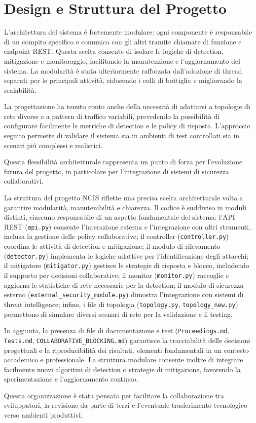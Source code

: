 \section{Design e Struttura del Progetto}
L'architettura del sistema è fortemente modulare: ogni componente è responsabile di un compito specifico e comunica con gli altri tramite chiamate di funzione e endpoint REST. Questa scelta consente di isolare le logiche di detection, mitigazione e monitoraggio, facilitando la manutenzione e l'aggiornamento del sistema. La modularità è stata ulteriormente rafforzata dall'adozione di thread separati per le principali attività, riducendo i colli di bottiglia e migliorando la scalabilità.\par
La progettazione ha tenuto conto anche della necessità di adattarsi a topologie di rete diverse e a pattern di traffico variabili, prevedendo la possibilità di configurare facilmente le metriche di detection e le policy di risposta. L'approccio seguito permette di validare il sistema sia in ambienti di test controllati sia in scenari più complessi e realistici.\par
Questa flessibilità architetturale rappresenta un punto di forza per l'evoluzione futura del progetto, in particolare per l'integrazione di sistemi di sicurezza collaborativi.

La struttura del progetto NCIS riflette una precisa scelta architetturale volta a garantire modularità, manutenibilità e chiarezza. Il codice è suddiviso in moduli distinti, ciascuno responsabile di un aspetto fondamentale del sistema: l'API REST (\texttt{api.py}) consente l'interazione esterna e l'integrazione con altri strumenti, inclusa la gestione delle policy collaborative; il controller (\texttt{controller.py}) coordina le attività di detection e mitigazione; il modulo di rilevamento (\texttt{detector.py}) implementa le logiche adattive per l'identificazione degli attacchi; il mitigatore (\texttt{mitigator.py}) gestisce le strategie di risposta e blocco, includendo il supporto per decisioni collaborative; il monitor (\texttt{monitor.py}) raccoglie e aggiorna le statistiche di rete necessarie per la detection; il modulo di sicurezza esterno (\texttt{external\_security\_module.py}) dimostra l'integrazione con sistemi di threat intelligence; infine, i file di topologia (\texttt{topology.py}, \texttt{topology\_new.py}) permettono di simulare diversi scenari di rete per la validazione e il testing.\par
In aggiunta, la presenza di file di documentazione e test (\texttt{Proceedings.md}, \texttt{Tests.md}, \texttt{COLLABORATIVE\_BLOCKING.md}) garantisce la tracciabilità delle decisioni progettuali e la riproducibilità dei risultati, elementi fondamentali in un contesto accademico e professionale. La struttura modulare consente inoltre di integrare facilmente nuovi algoritmi di detection o strategie di mitigazione, favorendo la sperimentazione e l'aggiornamento continuo.\par
Questa organizzazione è stata pensata per facilitare la collaborazione tra sviluppatori, la revisione da parte di terzi e l'eventuale trasferimento tecnologico verso ambienti produttivi.

